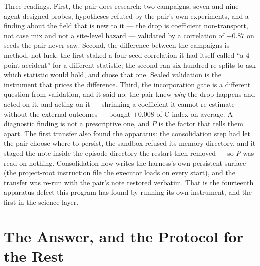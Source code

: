 \documentclass[11pt]{article}
\theoremstyle{definition}
\begin{document}
Three readings. First, the pair does research: two campaigns, seven and nine agent-designed probes, hypotheses refuted by the pair's own experiments, and a finding about the field that is new to it --- the drop is coefficient non-transport, not case mix and not a site-level hazard --- validated by a correlation of $-0.87$ on seeds the pair never saw. Second, the difference between the campaigns is method, not luck: the first staked a four-seed correlation it had itself called ``a 4-point accident'' for a different statistic; the second ran six hundred re-splits to ask which statistic would hold, and chose that one. Sealed validation is the instrument that prices the difference. Third, the incorporation gate is a different question from validation, and it said no: the pair knew \emph{why} the drop happens and acted on it, and acting on it --- shrinking a coefficient it cannot re-estimate without the external outcomes --- bought $+0.008$ of C-index on average. A diagnostic finding is not a prescriptive one, and $P$ is the factor that tells them apart. The first transfer also found the apparatus: the consolidation step had let the pair choose where to persist, the sandbox refused its memory directory, and it staged the note inside the episode directory the restart then removed --- so $P$ was read on nothing. Consolidation now writes the harness's own persistent surface (the project-root instruction file the executor loads on every start), and the transfer was re-run with the pair's note restored verbatim. That is the fourteenth apparatus defect this program has found by running its own instrument, and the first in the science layer.

\section{The Answer, and the Protocol for the Rest}\label{sec:answer}
\end{document}
